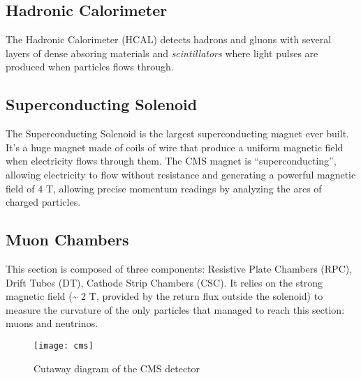\subsection{Hadronic Calorimeter}

The Hadronic Calorimeter (HCAL) detects hadrons and gluons with several layers of dense absoring materials and \textit{scintillators} where light pulses are produced when particles flows through.

\subsection{Superconducting Solenoid}

The Superconducting Solenoid is the largest superconducting magnet ever built. It's a huge magnet made of coils of wire that produce a uniform magnetic field when electricity flows through them. The CMS magnet is “superconducting”, allowing electricity to flow without resistance and generating a powerful magnetic field of 4 T, allowing precise momentum readings by analyzing the arcs of charged particles.

\subsection{Muon Chambers}

This section is composed of three components: Resistive Plate Chambers (RPC), Drift Tubes (DT), Cathode Strip Chambers (CSC). It relies on the strong magnetic field (\~{} 2 T, provided by the return flux outside the solenoid) to measure the curvature of the only particles that managed to reach this section: muons and neutrinos.


\begin{figure}
	\centerline{
		\texttt{[image: cms]}}
	\caption{Cutaway diagram of the CMS detector \cite{Sakuma_2014}}
	\label{fig:cms}
\end{figure}